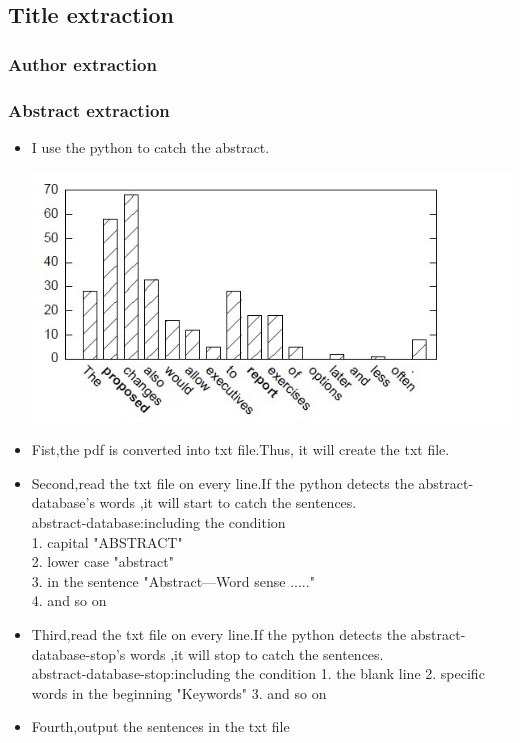 	
\subsection*{Title extraction}

\subsubsection*{Author extraction}


\subsubsection*{Abstract extraction}
\begin{itemize}
	\item I use the python to catch the abstract.
	\begin{center}
		\includegraphics[width=0.8\columnwidth]{Union_Background_Chart_2}
	\end{center}
	\item Fist,the pdf is converted into txt file.Thus, it will create the txt file.\\ 
	\item Second,read the txt file on every line.If the python detects the abstract-database's words ,it will start to catch the sentences.\\ 	
	abstract-database:including the condition\\
	1. capital         "ABSTRACT"\\
	2. lower case      "abstract"\\
	3. in the sentence "Abstract—Word sense ....."\\
	4. and so on \\
	\item Third,read the txt file on every line.If the python detects the abstract-database-stop's words ,it will stop to catch the sentences.\\ 
	abstract-database-stop:including the condition
	1. the blank line
	2. specific words in the beginning "Keywords"
	3. and so on
	\item Fourth,output the sentences in the txt file\\ 	
	
\end{itemize}

